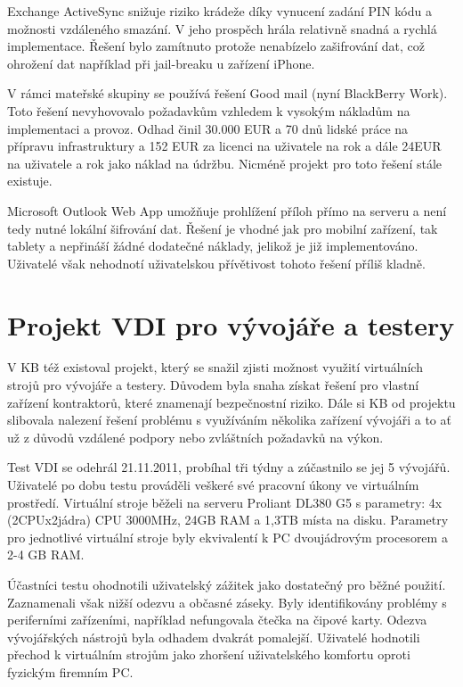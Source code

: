 Exchange ActiveSync snižuje riziko krádeže díky vynucení zadání PIN kódu a možnosti vzdáleného smazání. V jeho prospěch hrála relativně snadná a rychlá implementace. Řešení bylo zamítnuto protože nenabízelo zašifrování dat, což ohrožení dat například při jail-breaku u zařízení iPhone.

V rámci mateřské skupiny se používá řešení Good mail (nyní BlackBerry Work). Toto řešení nevyhovovalo požadavkům vzhledem k vysokým nákladům na implementaci a provoz. Odhad činil 30.000 EUR a 70 dnů lidské práce na přípravu infrastruktury a 152 EUR za licenci na uživatele na rok a dále 24EUR na uživatele a rok jako náklad na údržbu. Nicméně projekt pro toto řešení stále existuje.

Microsoft Outlook Web App umožňuje prohlížení příloh přímo na serveru a není tedy nutné lokální šifrování dat. Řešení je vhodné jak pro mobilní zařízení, tak tablety a nepřináší žádné dodatečné náklady, jelikož je již implementováno. Uživatelé však nehodnotí uživatelskou přívětivost tohoto řešení příliš kladně.

\section{Projekt VDI pro vývojáře a testery}\label{projektVDI}

V KB též existoval projekt, který se snažil zjisti možnost využití virtuálních strojů pro vývojáře a testery. Důvodem byla snaha získat řešení pro vlastní zařízení kontraktorů, které znamenají bezpečnostní riziko. Dále si KB od projektu slibovala nalezení řešení problému s využíváním několika zařízení vývojáři a to ať už z důvodů vzdálené podpory nebo zvláštních požadavků na výkon.

Test VDI se odehrál 21.11.2011, probíhal tři týdny a zúčastnilo se jej 5 vývojářů. Uživatelé po dobu testu prováděli veškeré své pracovní úkony ve virtuálním prostředí. Virtuální stroje běželi na serveru Proliant DL380 G5 s parametry: 4x (2CPUx2jádra) CPU 3000MHz, 24GB RAM a 1,3TB místa na disku. Parametry pro jednotlivé virtuální stroje byly ekvivalentí k PC dvoujádrovým procesorem a 2-4 GB RAM.

Účastníci testu ohodnotili uživatelský zážitek jako dostatečný pro běžné použití. Zaznamenali však nižší odezvu a občasné záseky. Byly identifikovány problémy s periferními zařízeními, například nefungovala čtečka na čipové karty. Odezva vývojářských nástrojů byla odhadem dvakrát pomalejší. Uživatelé hodnotili přechod k virtuálním strojům jako zhoršení uživatelského komfortu oproti fyzickým firemním PC. 


